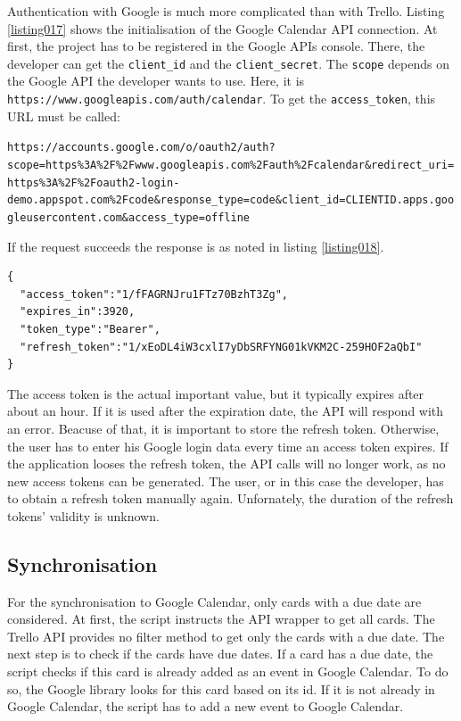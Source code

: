 Authentication with Google is much more complicated than with Trello. Listing \ref{listing017} shows the initialisation of the Google Calendar API connection. At first, the project has to be registered in the Google APIs console. \cite{google:apisconsole} There, the developer can get the \lstinline{client_id} and the \lstinline{client_secret}. The \lstinline{scope} depends on the Google API the developer wants to use. Here, it is \texttt{https://www.googleapis.com/auth/calendar}. \cite{google:apiscope} To get the \lstinline{access_token}, this URL must be called: 
\begin{center}
\lstinline{https://accounts.google.com/o/oauth2/auth?scope=https%3A%2F%2Fwww.googleapis.com%2Fauth%2Fcalendar&redirect_uri=https%3A%2F%2Foauth2-login-demo.appspot.com%2Fcode&response_type=code&client_id=CLIENTID.apps.googleusercontent.com&access_type=offline}
\end{center}

If the request succeeds the response is as noted in listing \ref{listing018}.

\begin{lstlisting}[aboveskip=1\baselineskip, caption=Response of the token request., label=listing018]
{
  "access_token":"1/fFAGRNJru1FTz70BzhT3Zg",
  "expires_in":3920,
  "token_type":"Bearer",
  "refresh_token":"1/xEoDL4iW3cxlI7yDbSRFYNG01kVKM2C-259HOF2aQbI"
}
\end{lstlisting}

The access token is the actual important value, but it typically expires after about an hour. If it is used after the expiration date, the API will respond with an error. Beacuse of that, it is important to store the refresh token. Otherwise, the user has to enter his Google login data every time an access token expires. If the application looses the refresh token, the API calls will no longer work, as no new access tokens can be generated. The user, or in this case the developer, has to obtain a refresh token manually again. \cite{google:calapi} Unfornately, the duration of the refresh tokens' validity is unknown.

\subsection{Synchronisation}
For the synchronisation to Google Calendar, only cards with a due date are considered. At first, the script instructs the API wrapper to get all cards. The Trello API provides no filter method to get only the cards with a due date. The next step is to check if the cards have due dates. If a card has a due date, the script checks if this card is already added as an event in Google Calendar. To do so, the Google library looks for this card based on its id. If it is not already in Google Calendar, the script has to add a new event to Google Calendar.

